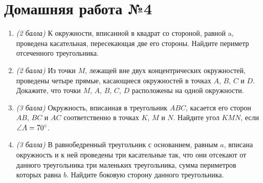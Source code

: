 \documentclass[12pt, a4paper]{article}
\begin{document}
	
	\section*{Домашняя работа №4}
	\begin{enumerate}
		\item \textit{(2 балла)} К окружности, вписанной в квадрат со стороной, равной a, проведена касательная, пересекающая две его стороны.
		Найдите периметр отсеченного треугольника.

		\item \textit{(2 балла)} Из точки $M$, лежащей вне двух концентрических окружностей, проведены четыре прямые, касающиеся окружностей в точках $A$, $B$, $C$ и $D$. Докажите, что точки $M$, $A$, $B$, $C$, $D$ расположены на одной окружности.
		\item \textit{(3 балла)} Окружность, вписанная в треугольник $ABC$, касается его сторон $AB$, $BC$ и $AC$ соответственно в точках $K$, $M$ и $N$.
		Найдите угол $KMN$, если $\angle A = 70\degree$.
		\item \textit{(3 балла)} В равнобедренный треугольник с основанием, равным $a$, вписана окружность и к ней проведены три касательные так, что они отсекают от данного треугольника три маленьких треугольника, сумма периметров которых равна $b$. Найдите боковую сторону данного треугольника.
	\end{enumerate}
\end{document}
